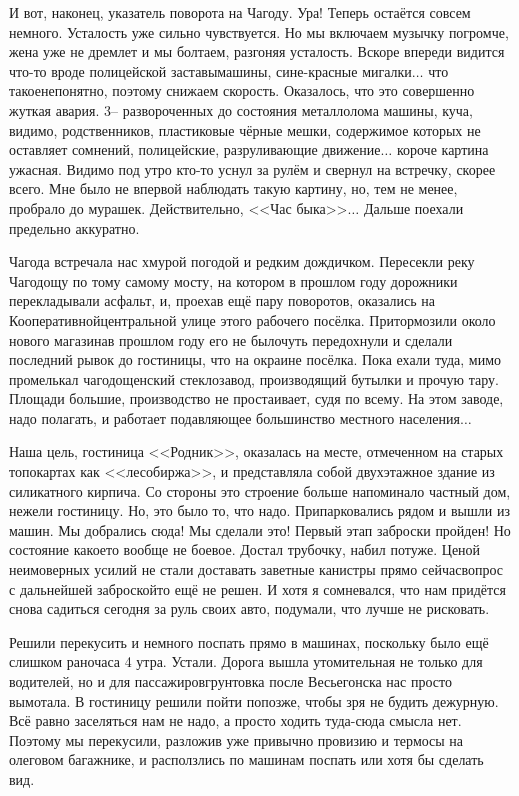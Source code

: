 И вот, наконец, указатель поворота на Чагоду. Ура! Теперь остаётся совсем немного. Усталость уже сильно чувствуется. Но мы включаем музычку погромче, жена уже не дремлет и мы болтаем, разгоняя усталость. Вскоре впереди видится что-то вроде полицейской заставы\mdash машины, сине-красные мигалки$\ldots$ что такое\mdash непонятно, поэтому снижаем скорость. Оказалось, что это совершенно жуткая авария. 3\thinspace\nobreakdash-- развороченных до состояния металлолома машины, куча, видимо, родственников, пластиковые чёрные мешки, содержимое которых не оставляет сомнений, полицейские, разруливающие движение$\ldots$ короче картина ужасная. Видимо под утро кто-то уснул за рулём и свернул на встречку, скорее всего. Мне было не впервой наблюдать такую картину, но, тем не менее, пробрало до мурашек. Действительно, <<Час быка>>$\ldots$ Дальше поехали предельно аккуратно.

Чагода встречала нас хмурой погодой и редким дождичком. Пересекли реку Чагодощу по тому самому мосту, на котором в прошлом году дорожники перекладывали асфальт, и, проехав ещё пару поворотов, оказались на Кооперативной\mdash центральной улице этого рабочего посёлка. Притормозили около нового магазина\mdash в прошлом году его не было\mdash чуть передохнули и сделали последний рывок до гостиницы, что на окраине посёлка. Пока ехали туда, мимо промелькал чагодощенский стеклозавод, производящий бутылки и прочую тару. Площади большие, производство не простаивает, судя по всему. На этом заводе, надо полагать, и работает подавляющее большинство местного населения$\ldots$

Наша цель, гостиница <<Родник>>, оказалась на месте, отмеченном на старых топокартах как <<лесобиржа>>, и представляла собой двухэтажное здание из силикатного кирпича. Со стороны это строение больше напоминало частный дом, нежели гостиницу. Но, это было то, что надо. Припарковались рядом и вышли из машин. Мы добрались сюда! Мы сделали это! Первый этап заброски пройден! Но состояние какое\sdash то вообще не боевое. Достал трубочку, набил потуже. Ценой неимоверных усилий не стали доставать заветные канистры прямо сейчас\mdash вопрос с дальнейшей заброской\sdash то ещё не решен. И хотя я сомневался, что нам придётся снова садиться сегодня за руль своих авто, подумали, что лучше не рисковать. 

Решили перекусить и немного поспать прямо в машинах, поскольку было ещё слишком рано\mdash часа 4 утра. Устали. Дорога вышла утомительная не только для водителей, но и для пассажиров\mdash грунтовка после Весьегонска нас просто вымотала. В гостиницу решили пойти попозже, чтобы зря не будить дежурную. Всё равно заселяться нам не надо, а просто ходить туда-сюда смысла нет. Поэтому мы перекусили, разложив уже привычно провизию и термосы на олеговом багажнике, и расползлись по машинам поспать или хотя бы сделать вид. 

